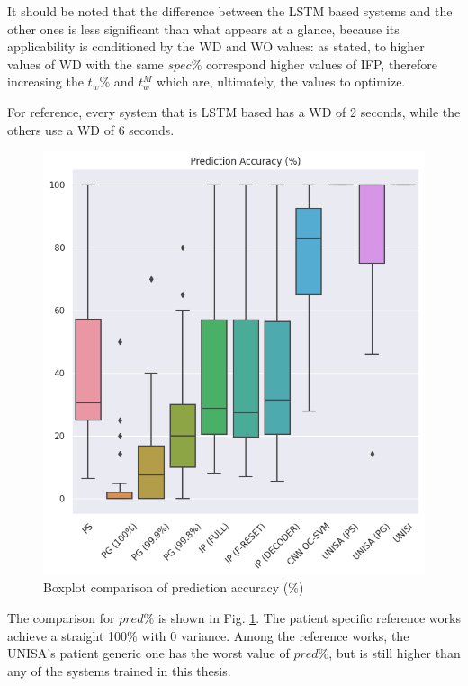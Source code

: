 It should be noted that the difference between the \gls{LSTM} based systems and the other ones is less significant than what appears at a glance, because its applicability is conditioned by the \gls{WD} and \gls{WO} values: as stated, to higher values of \gls{WD} with the same $spec\%$ correspond higher values of \gls{IFP}, therefore increasing the $\overline{t}_w\%$ and $t_w^M$ which are, ultimately, the values to optimize.

For reference, every system that is \gls{LSTM} based has a \gls{WD} of 2 seconds, while the others use a \gls{WD} of 6 seconds.

\begin{figure}[ht]
    \centering
    \includegraphics[width=1.0\textwidth]{images/Experimental-validation/boxplot_pred.png}
    \caption{Boxplot comparison of prediction accuracy (\%)}
    \label{fig:boxplot_pred}
\end{figure}

The comparison for $pred\%$ is shown in Fig. \ref{fig:boxplot_pred}. The patient specific reference works achieve a straight 100\% with 0 variance. Among the reference works, the UNISA's patient generic one has the worst value of $pred\%$, but is still higher than any of the systems trained in this thesis.

